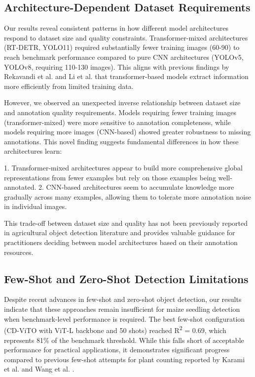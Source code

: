 \documentclass{article}
\begin{document}
\subsection{Architecture-Dependent Dataset Requirements}

Our results reveal consistent patterns in how different model architectures respond to dataset size and quality constraints. Transformer-mixed architectures (RT-DETR, YOLO11) required substantially fewer training images (60-90) to reach benchmark performance compared to pure CNN architectures (YOLOv5, YOLOv8, requiring 110-130 images). This aligns with previous findings by Rekavandi et al. \cite{rekavandiTransformersSmallObject2023} and Li et al. \cite{liTransformerObjectDetection2023} that transformer-based models extract information more efficiently from limited training data.

However, we observed an unexpected inverse relationship between dataset size and annotation quality requirements. Models requiring fewer training images (transformer-mixed) were more sensitive to annotation completeness, while models requiring more images (CNN-based) showed greater robustness to missing annotations. This novel finding suggests fundamental differences in how these architectures learn:

1. Transformer-mixed architectures appear to build more comprehensive global representations from fewer examples but rely on those examples being well-annotated.
2. CNN-based architectures seem to accumulate knowledge more gradually across many examples, allowing them to tolerate more annotation noise in individual images.

This trade-off between dataset size and quality has not been previously reported in agricultural object detection literature and provides valuable guidance for practitioners deciding between model architectures based on their annotation resources.

\subsection{Few-Shot and Zero-Shot Detection Limitations}

Despite recent advances in few-shot and zero-shot object detection, our results indicate that these approaches remain insufficient for maize seedling detection when benchmark-level performance is required. The best few-shot configuration (CD-ViTO with ViT-L backbone and 50 shots) reached R\textsuperscript{2} = 0.69, which represents 81\% of the benchmark threshold. While this falls short of acceptable performance for practical applications, it demonstrates significant progress compared to previous few-shot attempts for plant counting reported by Karami et al. \cite{karamiAutomaticPlantCounting2020} and Wang et al. \cite{wangAdvancingImageRecognition2024}.
\end{document}
